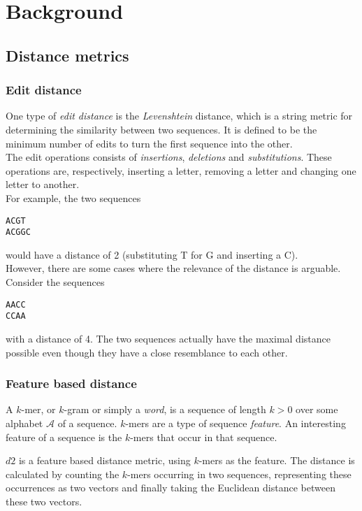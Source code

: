 \section{Background}

\subsection{Distance metrics}

\subsubsection{Edit distance}
One type of \emph{edit distance} is the \emph{Levenshtein} distance, which is a
string metric for determining the similarity between two sequences. It is
defined to be the minimum number of edits to turn the first sequence into the
other. \\
The edit operations consists of \emph{insertions}, \emph{deletions} and
\emph{substitutions}. These operations are, respectively, inserting a letter,
removing a letter and changing one letter to another. \\
For example, the two sequences
\begin{center}
\texttt{ACGT} \\
\texttt{ACGGC}
\end{center}
would have a distance of 2 (substituting T for G and inserting a C). \\
However, there are some cases where the relevance of the distance is arguable.
Consider the sequences
\begin{center}
\texttt{AACC} \\
\texttt{CCAA}
\end{center}
with a distance of 4. The two sequences actually have the maximal distance
possible even though they have a close resemblance to each other.


\subsubsection{Feature based distance}
A $k$-mer, or $k$-gram or simply a \emph{word}, is a sequence of length $k > 0$
over some alphabet $\mathcal{A}$ of a sequence. $k$-mers are a type of sequence
\emph{feature}. An interesting feature of a sequence is the $k$-mers that occur
in that sequence.

$d2$ is a feature based distance metric, using $k$-mers as the feature. The
distance is calculated by counting the $k$-mers occurring in two sequences,
representing these occurrences as two vectors and finally taking the Euclidean
distance between these two vectors. %

